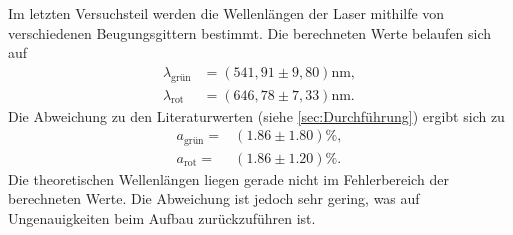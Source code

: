 Im letzten Versuchsteil werden die Wellenlängen der Laser mithilfe von verschiedenen Beugungsgittern bestimmt.
Die berechneten Werte belaufen sich auf
\begin{align*}
    \lambda_{\text{grün}} &= (541,91 \pm 9,80) \si{\nano\meter},\\
    \lambda_{\text{rot}} &= (646,78 \pm 7,33) \si{\nano\meter}.
\end{align*}
Die Abweichung zu den Literaturwerten (siehe \autoref{sec:Durchführung}) ergibt sich zu
\begin{align*}
    a_{\text{grün}}=& (1.86\pm 1.80) \si{\percent},\\
    a_{\text{rot}}=& (1.86 \pm 1.20) \si{\percent}.
\end{align*}
Die theoretischen Wellenlängen liegen gerade nicht im Fehlerbereich der berechneten Werte. Die Abweichung ist jedoch sehr gering,
was auf Ungenauigkeiten beim Aufbau zurückzuführen ist.
\pagebreak




